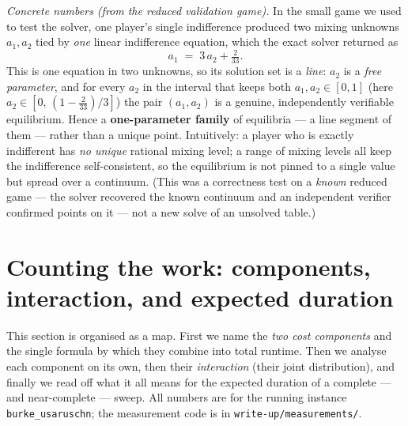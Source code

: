 \documentclass[11pt]{article}
\begin{document}
\emph{Concrete numbers (from the reduced validation game).} In the small game we used
to test the solver, one player's single indifference produced two mixing unknowns
$a_1,a_2$ tied by \emph{one} linear indifference equation, which the exact solver
returned as
\[
a_1 \;=\; 3\,a_2 + \tfrac{2}{33}.
\]
This is one equation in two unknowns, so its solution set is a \emph{line}: $a_2$ is
a \emph{free parameter}, and for every $a_2$ in the interval that keeps both
$a_1,a_2\in[0,1]$ (here $a_2\in[0,\,(1-\tfrac{2}{33})/3]$) the pair $(a_1,a_2)$ is a
genuine, independently verifiable equilibrium. Hence a \textbf{one-parameter family}
of equilibria --- a line segment of them --- rather than a unique point. Intuitively:
a player who is exactly indifferent has \emph{no unique} rational mixing level; a
range of mixing levels all keep the indifference self-consistent, so the equilibrium
is not pinned to a single value but spread over a continuum. (This was a correctness
test on a \emph{known} reduced game --- the solver recovered the known continuum and
an independent verifier confirmed points on it --- not a new solve of an unsolved
table.)

\section{Counting the work: components, interaction, and expected duration}
\label{sec:counting}

This section is organised as a map. First we name the \emph{two cost components} and
the single formula by which they combine into total runtime. Then we analyse each
component on its own, then their \emph{interaction} (their joint distribution), and
finally we read off what it all means for the expected duration of a complete --- and
near-complete --- sweep. All numbers are for the running instance
\texttt{burke\_usaruschn}; the measurement code is in \texttt{write-up/measurements/}.
\end{document}
